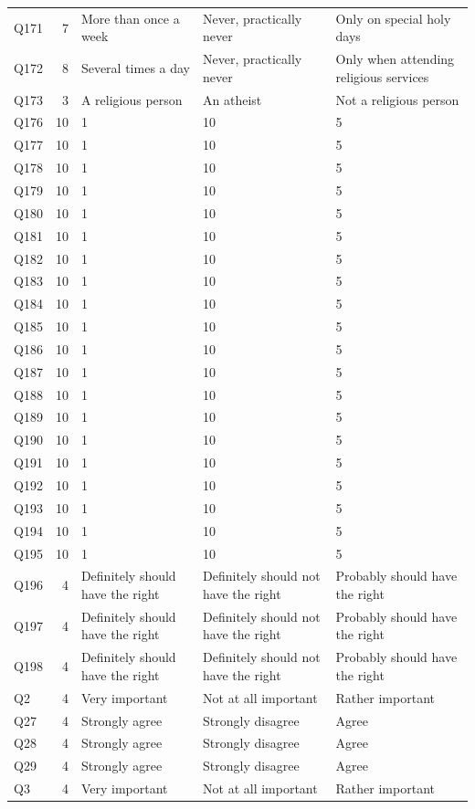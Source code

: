 \begin{longtable}{l r l l l}
Q171 & 7 & More than once a week & Never, practically never & Only on special holy days \\
Q172 & 8 & Several times a day & Never, practically never & Only when attending religious services \\
Q173 & 3 & A religious person & An atheist & Not a religious person \\
Q176 & 10 & 1 & 10 & 5 \\
Q177 & 10 & 1 & 10 & 5 \\
Q178 & 10 & 1 & 10 & 5 \\
Q179 & 10 & 1 & 10 & 5 \\
Q180 & 10 & 1 & 10 & 5 \\
Q181 & 10 & 1 & 10 & 5 \\
Q182 & 10 & 1 & 10 & 5 \\
Q183 & 10 & 1 & 10 & 5 \\
Q184 & 10 & 1 & 10 & 5 \\
Q185 & 10 & 1 & 10 & 5 \\
Q186 & 10 & 1 & 10 & 5 \\
Q187 & 10 & 1 & 10 & 5 \\
Q188 & 10 & 1 & 10 & 5 \\
Q189 & 10 & 1 & 10 & 5 \\
Q190 & 10 & 1 & 10 & 5 \\
Q191 & 10 & 1 & 10 & 5 \\
Q192 & 10 & 1 & 10 & 5 \\
Q193 & 10 & 1 & 10 & 5 \\
Q194 & 10 & 1 & 10 & 5 \\
Q195 & 10 & 1 & 10 & 5 \\
Q196 & 4 & Definitely should have the right & Definitely should not have the right & Probably should have the right \\
Q197 & 4 & Definitely should have the right & Definitely should not have the right & Probably should have the right \\
Q198 & 4 & Definitely should have the right & Definitely should not have the right & Probably should have the right \\
Q2 & 4 & Very important & Not at all important & Rather important \\
Q27 & 4 & Strongly agree & Strongly disagree & Agree \\
Q28 & 4 & Strongly agree & Strongly disagree & Agree \\
Q29 & 4 & Strongly agree & Strongly disagree & Agree \\
Q3 & 4 & Very important & Not at all important & Rather important \\

\end{longtable}
